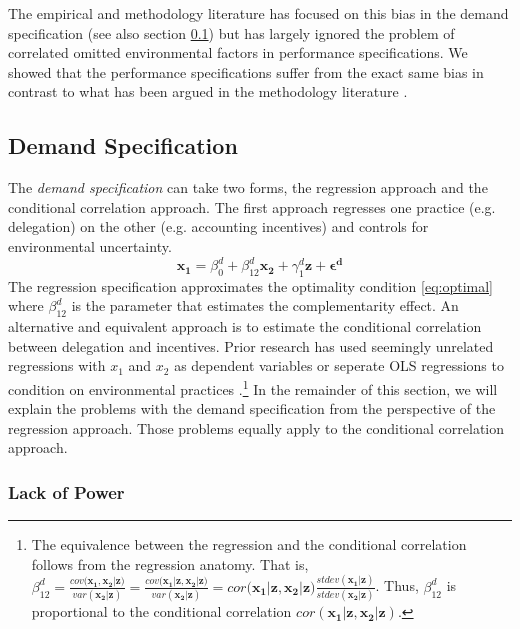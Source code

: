 \documentclass[12pt]{article}
\begin{document}
The empirical and methodology literature has focused on this bias in the demand specification (see also section \ref{demand-specification}) but has largely ignored the problem of correlated omitted environmental factors in performance specifications. We showed that the performance specifications suffer from the exact same bias in contrast to what has been argued in the methodology literature \citep{carree_note_2011}. 

\subsection{Demand Specification}\label{demand-specification}

The \emph{demand specification} can take two forms, the regression approach and the conditional correlation approach. The first approach regresses one practice (e.g. delegation) on the other (e.g. accounting incentives) and controls for environmental uncertainty.
\begin{equation*} 
\mathbf{x_1} = \beta_0^d + \beta_{12}^d \mathbf{x_2} 
        + \gamma_{1}^d \mathbf{z}
        + \mathbf{\epsilon^d}
\end{equation*}
The regression specification approximates the optimality condition \eqref{eq:optimal} where \(\beta^d_{12}\) is the parameter that estimates the complementarity effect. An alternative and equivalent approach is to estimate the conditional correlation between delegation and incentives. Prior research has used seemingly unrelated regressions with $x_1$ and $x_2$ as dependent variables or seperate OLS regressions to condition on environmental practices \citep{indjejikian_accounting_2012, matejka_balancing_2017}.\footnote{The equivalence between the regression and the conditional correlation follows from the regression anatomy. That is, $\beta^d_{12}=\frac{cov(\mathbf{x_1}, \mathbf{x_2|z)}}{var (\mathbf{x_2|z})}=\frac{cov(\mathbf{x_1|z}, \mathbf{x_2|z)}}{var (\mathbf{x_2|z})}=cor(\mathbf{x_1|z}, \mathbf{x_2|z)}\frac{stdev(\mathbf{x_1|z})}{stdev (\mathbf{x_2|z})}$. Thus, $\beta^d_{12}$ is proportional to the conditional correlation $cor(\mathbf{x_1|z}, \mathbf{x_2|z})$.} In the remainder of this section, we will explain the problems with the demand specification from the perspective of the regression approach. Those problems equally apply to the conditional correlation approach.  

\subsubsection{Lack of Power}
\end{document}
